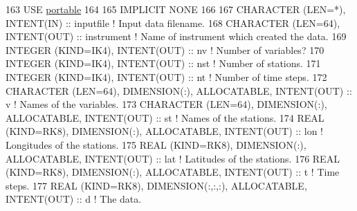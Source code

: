 \begin{DoxyCode}
163     \textcolor{keywordtype}{USE }\hyperlink{namespaceportable}{portable}
164 
165     \textcolor{keywordtype}{IMPLICIT NONE}
166 
167     \textcolor{keywordtype}{CHARACTER (LEN=*)}, \textcolor{keywordtype}{INTENT(IN)}                                       :: inputfile    \textcolor{comment}{! Input data
       filename.}
168     \textcolor{keywordtype}{CHARACTER (LEN=64)}, \textcolor{keywordtype}{INTENT(OUT)}                                     :: instrument   \textcolor{comment}{! Name of
       instrument which created the data.}
169     \textcolor{keywordtype}{INTEGER (KIND=IK4)}, \textcolor{keywordtype}{INTENT(OUT)}                                     :: nv           \textcolor{comment}{! Number of
       variables?}
170     \textcolor{keywordtype}{INTEGER (KIND=IK4)}, \textcolor{keywordtype}{INTENT(OUT)}                                     :: nst          \textcolor{comment}{! Number of
       stations.}
171     \textcolor{keywordtype}{INTEGER (KIND=IK4)}, \textcolor{keywordtype}{INTENT(OUT)}                                     :: nt           \textcolor{comment}{! Number of time
       steps.}
172     \textcolor{keywordtype}{CHARACTER (LEN=64)}, \textcolor{keywordtype}{DIMENSION(:)}, \textcolor{keywordtype}{ALLOCATABLE}, \textcolor{keywordtype}{INTENT(OUT)}          :: v            \textcolor{comment}{! Names of the
       variables.}
173     \textcolor{keywordtype}{CHARACTER (LEN=64)}, \textcolor{keywordtype}{DIMENSION(:)}, \textcolor{keywordtype}{ALLOCATABLE}, \textcolor{keywordtype}{INTENT(OUT)}          :: st           \textcolor{comment}{! Names of the
       stations.}
174     \textcolor{keywordtype}{REAL (KIND=RK8)}, \textcolor{keywordtype}{DIMENSION(:)}, \textcolor{keywordtype}{ALLOCATABLE}, \textcolor{keywordtype}{INTENT(OUT)}             :: lon          \textcolor{comment}{! Longitudes of the
       stations.}
175     \textcolor{keywordtype}{REAL (KIND=RK8)}, \textcolor{keywordtype}{DIMENSION(:)}, \textcolor{keywordtype}{ALLOCATABLE}, \textcolor{keywordtype}{INTENT(OUT)}             :: lat          \textcolor{comment}{! Latitudes of the
       stations.}
176     \textcolor{keywordtype}{REAL (KIND=RK8)}, \textcolor{keywordtype}{DIMENSION(:)}, \textcolor{keywordtype}{ALLOCATABLE}, \textcolor{keywordtype}{INTENT(OUT)}             :: t            \textcolor{comment}{! Time steps.}
177     \textcolor{keywordtype}{REAL (KIND=RK8)}, \textcolor{keywordtype}{DIMENSION(:,:,:)}, \textcolor{keywordtype}{ALLOCATABLE}, \textcolor{keywordtype}{INTENT(OUT)}         :: d            \textcolor{comment}{! The data.}

\end{DoxyCode}
